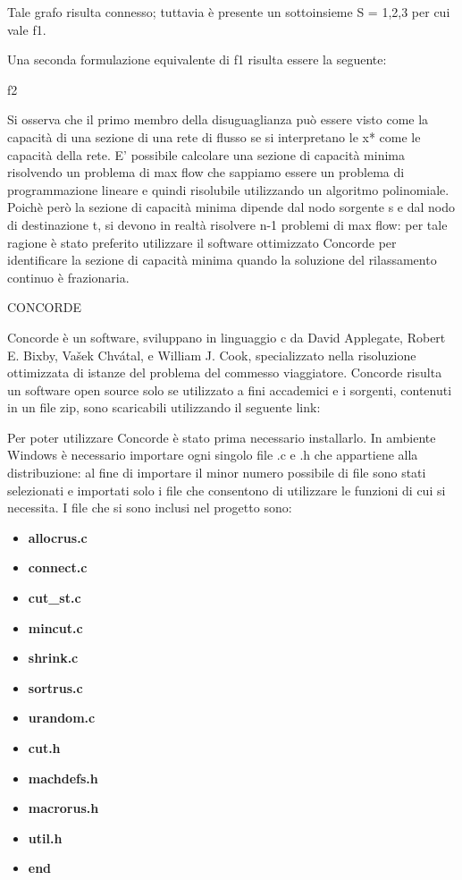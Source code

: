 \documentclass[11pt]{article}
\begin{document}
Tale grafo risulta connesso; tuttavia è presente un sottoinsieme S = {1,2,3} per cui vale f1.

Una seconda formulazione equivalente di f1 risulta essere la seguente:

f2

Si osserva che il primo membro della disuguaglianza può essere visto come la capacità di una sezione di una rete di flusso se si interpretano le x* come le capacità della rete.
E' possibile calcolare una sezione di capacità minima risolvendo un problema di max flow che sappiamo essere un problema di programmazione lineare e quindi risolubile utilizzando un algoritmo polinomiale.
Poichè però la sezione di capacità minima dipende dal nodo sorgente s e dal nodo di destinazione t, si devono in realtà risolvere n-1 problemi di max flow: per tale ragione è stato preferito utilizzare il software ottimizzato Concorde per identificare la sezione di capacità minima quando la soluzione del rilassamento continuo è frazionaria. 

\vspace{2\baselineskip}
CONCORDE
\vspace{2\baselineskip}

Concorde è un software, sviluppano in linguaggio c da David Applegate, Robert E. Bixby, Vašek Chvátal, e William J. Cook, specializzato nella risoluzione ottimizzata di istanze del problema del commesso viaggiatore. Concorde risulta un software open source solo se utilizzato a fini accademici e i sorgenti, contenuti in un file zip, sono scaricabili utilizzando il seguente link:




Per poter utilizzare Concorde è stato prima necessario installarlo. In ambiente Windows è necessario importare ogni singolo file .c e .h che appartiene alla distribuzione: al fine di importare il minor numero possibile di file sono stati selezionati e importati solo i file che consentono di utilizzare le funzioni di cui si necessita. I file che si sono inclusi nel progetto sono:


\begin{itemize}
	\item \textbf{allocrus.c}
	\item \textbf{connect.c}
	\item \textbf{cut\_st.c}
	\item \textbf{mincut.c}
	\item \textbf{shrink.c}
	\item \textbf{sortrus.c}
	\item \textbf{urandom.c}
	\item \textbf{cut.h}
	\item \textbf{machdefs.h}
	\item \textbf{macrorus.h}
	\item \textbf{util.h}
	\item \textbf{end}
\end{itemize}
\end{document}

